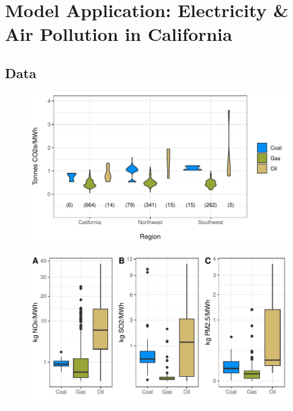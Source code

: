 ~
\newpage
\section{Model Application: Electricity \& Air Pollution in California}

\subsection{Data}



\begin{figure}
    \includegraphics[width=\textwidth]{figures/chapter5_figures/EI_region_violin.pdf}
\end{figure}

\begin{figure}
    \includegraphics[width=\textwidth]{figures/chapter5_figures/local_poll_EI.pdf}
\end{figure}

